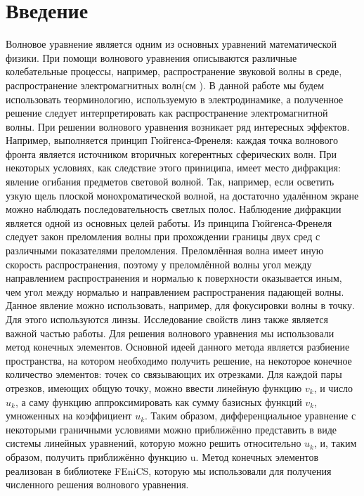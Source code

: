\documentclass[
11pt,%
tightenlines,%
twoside,%
onecolumn,%
nofloats,%
nobibnotes,%
nofootinbib,%
superscriptaddress,%
noshowpacs,%
centertags]%
{revtex4}
\begin{document}
\section{Введение}
Волновое уравнение является одним из основных уравнений математической физики. При помощи
волнового уравнения описываются различные колебательные процессы, например, 
распространение звуковой волны в среде, распространение электромагнитных волн(см \cite{Siv}). В данной работе
мы будем использовать теорминологию, используемую в электродинамике, а полученное решение 
следует интерпретировать как распространение электромагнитной волны. \newline
При решении волнового уравнения возникает ряд интересных эффектов. Например, выполняется принцип
Гюйгенса-Френеля: каждая точка волнового фронта является источником вторичных
когерентных сферических волн. При некоторых условиях, как следствие этого приниципа, 
имеет место дифракция: явление огибания предметов световой волной. Так, например, если осветить
узкую щель плоской монохроматической волной, на достаточно удалённом экране можно наблюдать
последовательность светлых полос. Наблюдение дифракции является одной из основных целей
работы.\newline
Из принципа Гюйгенса-Френеля следует закон преломления волны при прохождении границы двух сред
с различными показателями преломления. Преломлённая волна имеет иную скорость распространения, поэтому
у преломлённой волны угол между направлением распространения и нормалью к поверхности оказывается
иным, чем угол между нормалью и направлением распространения падающей волны. Данное явление
можно использовать, например, для фокусировки волны в точку. Для этого используются
линзы. Исследование свойств линз также является важной частью работы. \newline
Для решения волнового уравнения мы использовали метод конечных элементов. Основной идеей данного
метода является разбиение пространства, на котором необходимо получить решение, на некоторое
конечное количество элементов: точек со связывающих их отрезками. Для каждой пары отрезков, имеющих
общую точку, можно ввести линейную функцию $v_k$, и число $u_k$, а саму функцию аппроксимировать как
сумму базисных функций $v_k$, умноженных на коэффициент $u_k$. Таким образом, дифференциальное уравнение
с некоторыми граничными условиями можно приближённо представить в виде системы линейных уравнений,
которую можно решить относительно $u_k$, и, таким образом, получить приближённо функцию u. Метод 
конечных элементов реализован в библиотеке FEniCS, которую мы использовали для получения численного
решения волнового уравнения.
\end{document}
